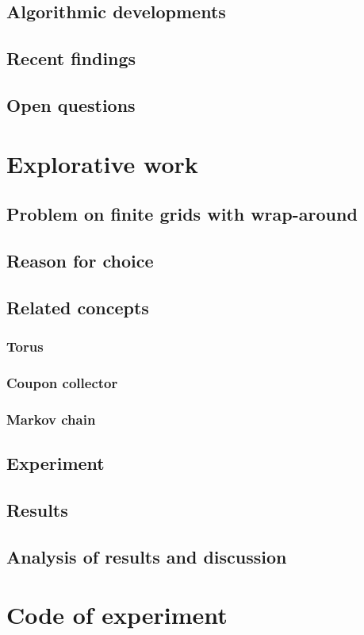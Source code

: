 \documentclass{article}
\begin{document}
\subsection{Algorithmic developments}
\subsection{Recent findings}
\subsection{Open questions}

\section{Explorative work}
\subsection{Problem on finite grids with wrap-around}
\subsection{Reason for choice}
\subsection{Related concepts}
\subsubsection{Torus}
\subsubsection{Coupon collector}
\subsubsection{Markov chain}
\subsection{Experiment}
\subsection{Results}
\subsection{Analysis of results and discussion}

\section{Code of experiment}
\end{document}
